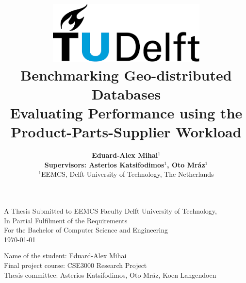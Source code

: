 \documentclass{article}
\begin{document}
\title{
    \includegraphics[width=8cm, keepaspectratio]{tudelftlogo.png}\\
    \vspace*{2cm}
    \textbf{
         Benchmarking Geo-distributed Databases \\
         \large Evaluating Performance using the Product-Parts-Supplier Workload
    }\\
    \vspace*{1cm}
}

\author{
    \textbf{Eduard-Alex Mihai$^1$}\\
    \hfill \break
    \textbf{Supervisors: Asterios Katsifodimos$^1$, Oto Mráz$^1$}\\
    \break
    {\large 
        \hfill \break
        $^1$EEMCS, Delft University of Technology, The Netherlands
    }\\
}

\date{}

\maketitle
\thispagestyle{empty}

\let\clearpagebackup\clearpage
\renewcommand{\clearpage}{ }

\onecolumn

\vspace*{1.5cm}
\begin{center}
    A Thesis Submitted to EEMCS Faculty Delft University of Technology,\\
    In Partial Fulfilment of the Requirements\\
    For the Bachelor of Computer Science and Engineering\\
    \today
\end{center}

\vspace*{2cm}

\noindent
{\small
Name of the student: Eduard-Alex Mihai \\
Final project course: CSE3000 Research Project\\
Thesis committee: Asterios Katsifodimos, Oto Mráz, Koen Langendoen\\
}
\vfill
\end{document}
